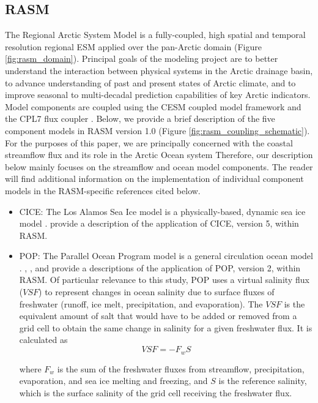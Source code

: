 \documentclass[jgrga, draft]{agutex}
\begin{document}
\begin{article}
\subsection{RASM}
\label{sec:rasm}
The Regional Arctic System Model is a fully-coupled, high spatial and temporal resolution regional ESM applied over the pan-Arctic domain (Figure \ref{fig:rasm_domain}).
Principal goals of the modeling project are to better understand the interaction between physical systems in the Arctic drainage basin, to advance understanding of past and present states of Arctic climate, and to improve seasonal to multi-decadal prediction capabilities of key Arctic indicators.
Model components are coupled using the CESM coupled model framework and the CPL7 flux coupler \citep{Craig_2011}.
Below, we provide a brief description of the five component models in RASM version 1.0 (Figure \ref{fig:rasm_coupling_schematic}).
For the purposes of this paper, we are principally concerned with the coastal streamflow flux and its role in the Arctic Ocean system
Therefore, our description below mainly focuses on the streamflow and ocean model components.
The reader will find additional information on the implementation of individual component models in the RASM-specific references cited below.

\begin{itemize}[leftmargin=+.5in]
\item CICE: The Los Alamos Sea Ice model is a physically-based, dynamic sea ice model \citep{Hunke_2010}.
\citet{Roberts_2015a} provide a description of the application of CICE, version 5, within RASM.
\item POP: The Parallel Ocean Program model is a general circulation ocean model \citep{Smith_2010}.
\citet{Maslowski_2012}, \citet{Roberts_2015a}, and \citet{Osinski_2016} provide a descriptions of the application of POP, version 2, within RASM.
Of particular relevance to this study, POP uses a virtual salinity flux ($VSF$) to represent changes in ocean salinity due to surface fluxes of freshwater (runoff, ice melt, precipitation, and evaporation).
The $VSF$ is the equivalent amount of salt that would have to be added or removed from a grid cell to obtain the same change in salinity for a given freshwater flux.
It is calculated as
\begin{equation}
  \label{eq:SaltFlux}
  VSF=-F_w S
\end{equation}

where $F_w$ is the sum of the freshwater fluxes from streamflow, precipitation, evaporation, and sea ice melting and freezing, and $S$ is the reference salinity, which is the surface salinity of the grid cell receiving the freshwater flux.


\end{itemize}
\end{article}
\end{document}
